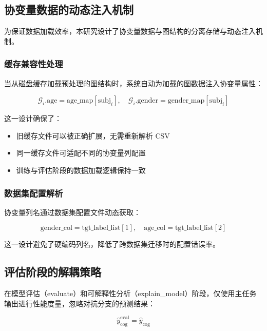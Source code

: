 \subsection{协变量数据的动态注入机制}

为保证数据加载效率，本研究设计了协变量数据与图结构的分离存储与动态注入机制。

\subsubsection{缓存兼容性处理}

当从磁盘缓存加载预处理的图结构时，系统自动为加载的图数据注入协变量属性：

\begin{equation}
\mathcal{G}_i.\text{age} = \text{age\_map}[\text{subj}_i], \quad \mathcal{G}_i.\text{gender} = \text{gender\_map}[\text{subj}_i]
\end{equation}

这一设计确保了：
\begin{itemize}
    \item 旧缓存文件可以被正确扩展，无需重新解析 CSV
    \item 同一缓存文件可适配不同的协变量列配置
    \item 训练与评估阶段的数据加载逻辑保持一致
\end{itemize}

\subsubsection{数据集配置解析}

协变量列名通过数据集配置文件动态获取：

\begin{equation}
\text{gender\_col} = \text{tgt\_label\_list}[1], \quad \text{age\_col} = \text{tgt\_label\_list}[2]
\end{equation}

这一设计避免了硬编码列名，降低了跨数据集迁移时的配置错误率。

\subsection{评估阶段的解耦策略}

在模型评估（evaluate）和可解释性分析（explain\_model）阶段，仅使用主任务输出进行性能度量，忽略对抗分支的预测结果：

\begin{equation}
\hat{y}_{\text{cog}}^{\text{eval}} = \hat{y}_{\text{cog}}
\end{equation}

